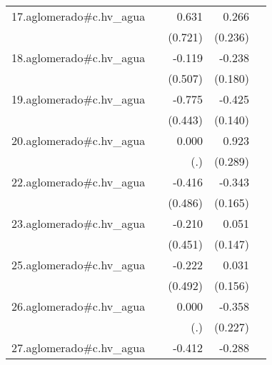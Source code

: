{\begin{longtable}{l*{4}{D{.}{.}{-1}}}
\addlinespace
17.aglomerado#c.hv\_agua&                     &       0.631         &       0.266         &                     \\
            &                     &     (0.721)         &     (0.236)         &                     \\
\addlinespace
18.aglomerado#c.hv\_agua&                     &      -0.119         &      -0.238         &                     \\
            &                     &     (0.507)         &     (0.180)         &                     \\
\addlinespace
19.aglomerado#c.hv\_agua&                     &      -0.775         &      -0.425\sym{**} &                     \\
            &                     &     (0.443)         &     (0.140)         &                     \\
\addlinespace
20.aglomerado#c.hv\_agua&                     &       0.000         &       0.923\sym{**} &                     \\
            &                     &         (.)         &     (0.289)         &                     \\
\addlinespace
22.aglomerado#c.hv\_agua&                     &      -0.416         &      -0.343\sym{*}  &                     \\
            &                     &     (0.486)         &     (0.165)         &                     \\
\addlinespace
23.aglomerado#c.hv\_agua&                     &      -0.210         &       0.051         &                     \\
            &                     &     (0.451)         &     (0.147)         &                     \\
\addlinespace
25.aglomerado#c.hv\_agua&                     &      -0.222         &       0.031         &                     \\
            &                     &     (0.492)         &     (0.156)         &                     \\
\addlinespace
26.aglomerado#c.hv\_agua&                     &       0.000         &      -0.358         &                     \\
            &                     &         (.)         &     (0.227)         &                     \\
\addlinespace
27.aglomerado#c.hv\_agua&                     &      -0.412         &      -0.288         &                     \\

\end{longtable}}
